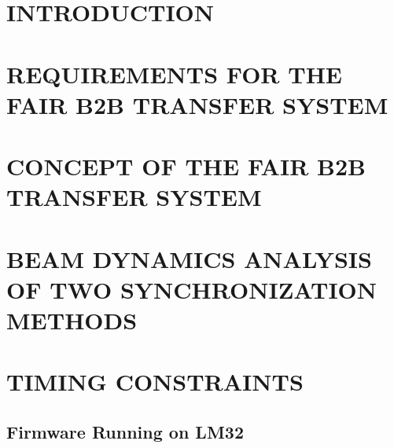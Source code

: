 \documentclass[%
 reprint,
 amsmath,amssymb,
 aps,
]{revtex4-1}
\begin{document}
\maketitle


\section{\label{sec:introduction}INTRODUCTION}


\section{\label{sec:WRnetwork}REQUIREMENTS FOR THE FAIR B2B TRANSFER SYSTEM}


\section{\label{concept}CONCEPT OF THE FAIR B2B TRANSFER SYSTEM}


\section{\label{dynamics}BEAM DYNAMICS ANALYSIS OF TWO SYNCHRONIZATION METHODS}


\section{\label{timing}TIMING CONSTRAINTS}


\subsection{\label{testsetup}Firmware Running on LM32}


%

%
\end{document}
